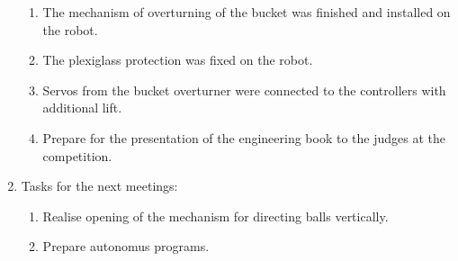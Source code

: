 \begin{enumerate}
\begin{enumerate}
			\item The mechanism of overturning of the bucket was finished and installed on the robot.
			
			\item The plexiglass protection was fixed on the robot.
			
			\item Servos from the bucket overturner were connected to the controllers with additional lift.
			
			\item Prepare for the presentation of the engineering book to the judges at the competition.
			
	\end{enumerate}
	
	\item Tasks for the next meetings:
	\begin{enumerate}
		
		\item Realise opening of the mechanism for directing balls vertically.
		
		\item Prepare autonomus programs.
			
	\end{enumerate}
\end{enumerate}
\fillpage
